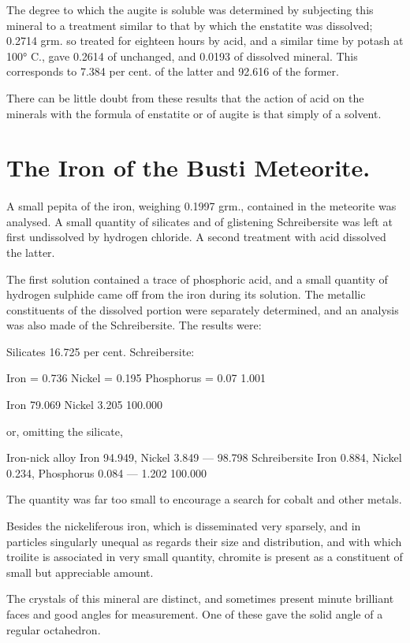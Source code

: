\documentclass[a4paper, 12pt, oneside]{article}
\begin{document}
The degree to which the augite is soluble was determined by subjecting this mineral to a treatment similar to that by which the enstatite was dissolved; 0.2714 grm. so treated for eighteen hours by acid, and a similar time by potash at 100° C., gave 0.2614 of unchanged, and 0.0193 of dissolved mineral. This corresponds to 7.384 per cent. of the latter and 92.616 of the former.

There can be little doubt from these results that the action of acid on the minerals with the formula of enstatite or of augite is that simply of a solvent.
\clearpage
\section{The Iron of the Busti Meteorite.}
\paragraph{}
A small pepita of the iron, weighing 0.1997 grm., contained in the meteorite was analysed. A small quantity of silicates and of glistening Schreibersite was left at first undissolved by hydrogen chloride. A second treatment with acid dissolved the latter.

The first solution contained a trace of phosphoric acid, and a small quantity of hydrogen sulphide came off from the iron during its solution. The metallic constituents of the dissolved portion were separately determined, and an analysis was also made of the Schreibersite. The results were:

Silicates 16.725 per cent.  
Schreibersite:  

Iron = 0.736  
Nickel = 0.195  
Phosphorus = 0.07  
1.001  

Iron 79.069  
Nickel 3.205  
100.000

or, omitting the silicate,

Iron-nick alloy {Iron 94.949, Nickel 3.849} --- 98.798  
Schreibersite {Iron 0.884, Nickel 0.234, Phosphorus 0.084} --- 1.202  
100.000

The quantity was far too small to encourage a search for cobalt and other metals.

Besides the nickeliferous iron, which is disseminated very sparsely, and in particles singularly unequal as regards their size and distribution, and with which troilite is associated in very small quantity, chromite is present as a constituent of small but appreciable amount.

The crystals of this mineral are distinct, and sometimes present minute brilliant faces and good angles for measurement. One of these gave the solid angle of a regular octahedron.
\clearpage
\end{document}
